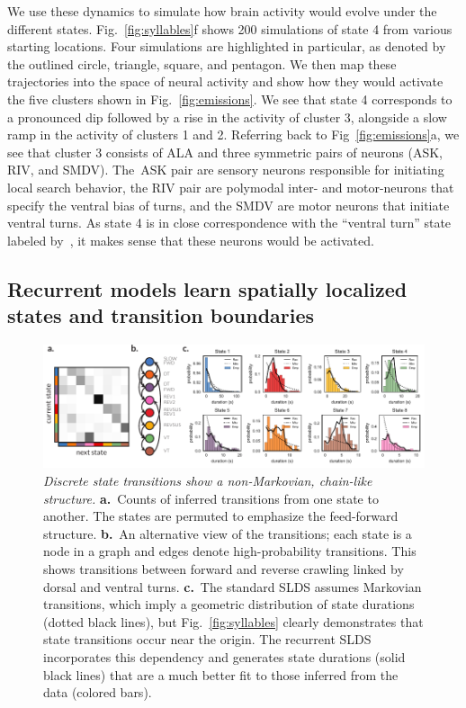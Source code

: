 \documentclass[11pt]{article}
\begin{document}
We use these dynamics to simulate how brain activity would evolve
under the different states. Fig.~\ref{fig:syllables}f shows 200
simulations of state 4 from various starting locations.  Four
simulations are highlighted in particular, as denoted by the outlined
circle, triangle, square, and pentagon.  We then map these
trajectories into the space of neural activity and show how they would
activate the five clusters shown in Fig.~\ref{fig:emissions}.  We see
that state 4 corresponds to a pronounced dip followed by a rise in the
activity of cluster 3, alongside a slow ramp in the activity of
clusters 1 and 2. Referring back to Fig~\ref{fig:emissions}a, we see
that cluster 3 consists of \textsf{ALA} and three symmetric pairs of
neurons (\textsf{ASK}, \textsf{RIV}, and \textsf{SMDV}).  The~\textsf{ASK}
pair are sensory neurons responsible for initiating local search behavior,
the \textsf{RIV} pair are polymodal inter- and motor-neurons that specify
the ventral bias of turns, and the \textsf{SMDV} are motor neurons
that initiate ventral turns. As state 4 is in close correspondence with
the ``ventral turn'' state labeled by~\citet{kato2015global}, it makes
sense that these neurons would be activated.




\subsection*{Recurrent models learn spatially localized states and transition boundaries}

\begin{figure}[t!]
\centering
\includegraphics[width=6in]{figures/figure4} 
\caption{ \textit{Discrete state transitions show a non-Markovian,
    chain-like structure.}  \textbf{a.}~Counts of inferred transitions
  from one state to another. The states are permuted to emphasize the
  feed-forward structure.  \textbf{b.}~An alternative view of the
  transitions; each state is a node in a graph and edges denote
  high-probability transitions.  This shows transitions between
  forward and reverse crawling linked by dorsal and ventral turns.
  \textbf{c.}~The standard SLDS assumes Markovian transitions, which
  imply a geometric distribution of state durations (dotted black
  lines), but Fig.~\ref{fig:syllables} clearly demonstrates that state
  transitions occur near the origin.  The recurrent SLDS incorporates
  this dependency and generates state durations (solid black lines)
  that are a much better fit to those inferred from the data (colored
  bars).  }
\label{fig:recurrent}
\end{figure}
\end{document}

